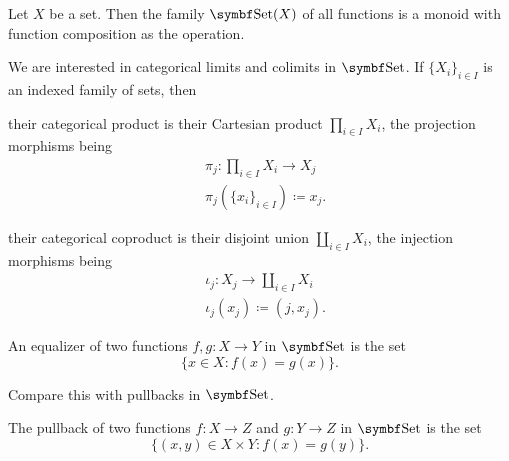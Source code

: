 \begin{corollary}\label{thm:functions_over_set_form_monoid}
  Let \( X \) be a set. Then the family \( \Cat{Set}(X) \) of all functions is a monoid with function composition as the operation.
\end{corollary}

\begin{proposition}\label{thm:set_categorical_limits}
  We are interested in categorical limits and colimits in \( \Cat{Set} \). If \( \{ X_i \}_{i \in I} \) is an indexed family of sets, then
  \begin{defenum}
     their categorical product is their Cartesian product \( \prod_{i \in I} X_i \), the projection morphisms being
    \begin{align*}
      &\pi_j: \prod_{i \in I} X_i \to X_j \\
      &\pi_j(\{ x_i \}_{i \in I}) \coloneqq x_j.
    \end{align*}

     their categorical coproduct is their disjoint union \( \coprod_{i \in I} X_i \), the injection morphisms being
    \begin{align*}
      &\iota_j: X_j \to \coprod_{i \in I} X_i \\
      &\iota_j(x_j) \coloneqq (j, x_j).
    \end{align*}

     An equalizer of two functions \( f, g: X \to Y \) in \( \Cat{Set} \) is the set
    \begin{equation*}
      \{ x \in X \colon f(x) = g(x) \}.
    \end{equation*}

    Compare this with pullbacks in \( \Cat{Set} \).

     The pullback of two functions \( f: X \to Z \) and \( g: Y \to Z \) in \( \Cat{Set} \) is the set
    \begin{equation*}
      \{ (x, y) \in X \times Y \colon f(x) = g(y) \}.
    \end{equation*}


\end{defenum}
\end{proposition}
